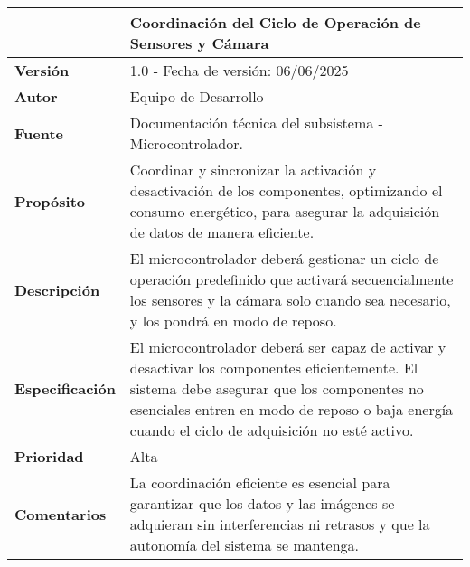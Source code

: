 \begin{longtable}{|l|p{12cm}|}
\hline
\textbf{} & \textbf{Coordinación del Ciclo de Operación de Sensores y Cámara} \\
\hline
\endfirsthead
\hline
\textbf{Versión} & 1.0 - Fecha de versión: 06/06/2025 \\
\hline
\textbf{Autor} & Equipo de Desarrollo \\
\hline
\textbf{Fuente} & Documentación técnica del subsistema - Microcontrolador. \\
\hline
\textbf{Propósito} & Coordinar y sincronizar la activación y desactivación de los componentes, optimizando el consumo energético, para asegurar la adquisición de datos de manera eficiente. \\
\hline
\textbf{Descripción} & El microcontrolador deberá gestionar un ciclo de operación predefinido que activará secuencialmente los sensores y la cámara solo cuando sea necesario, y los pondrá en modo de reposo. \\
\hline
\textbf{Especificación} &  El microcontrolador deberá ser capaz de activar y desactivar los componentes eficientemente. El sistema debe asegurar que los componentes no esenciales entren en modo de reposo o baja energía cuando el ciclo de adquisición no esté activo. \\
\hline
\textbf{Prioridad} & Alta \\
\hline
\textbf{Comentarios} & La coordinación eficiente es esencial para garantizar que los datos y las imágenes se adquieran sin interferencias ni retrasos y que la autonomía del sistema se mantenga. \\
\hline
\end{longtable}

